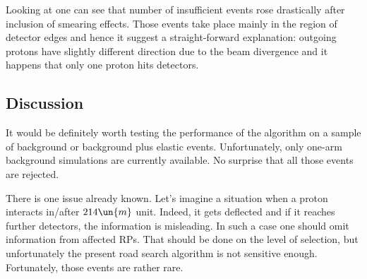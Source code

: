 Looking at  one can see that number of insufficient events rose drastically after inclusion of smearing effects. Those events take place mainly in the region of detector edges and hence it suggest a straight-forward explanation: outgoing protons have slightly different direction due to the beam divergence and it happens that only one proton hits detectors.



\subsection[disc]{Discussion}

It would be definitely worth testing the performance of the algorithm on a sample of background or background plus elastic events. Unfortunately, only one-arm background simulations are currently available. No surprise that all those events are rejected.

There is one issue already known. Let's imagine a situation when a proton interacts in/after $214\un{m}$ unit. Indeed, it gets deflected and if it reaches further detectors, the information is misleading. In such a case one should omit information from affected RPs. That should be done on the level of selection, but unfortunately the present road search algorithm is not sensitive enough. Fortunately, those events are rather rare.

\iffalse
In order to avoid those problems, it is necessary to improve the selection algorithm. Instead of road search algorithm, one can use a proper pattern recognition algorithm with pattern defined by \Eq{elr track general}. This can be implemented on the level of elastic reconstruction or better a lever lower. Instead of (current) selecting hits RP by RP, this might be done using all hits available. This might be very useful in the case a detector has more than one hit. Using information from other detectors, one may remove the ambiguity in pairing $u$ and $v$ strips. This needs to be discussed.
\fi



